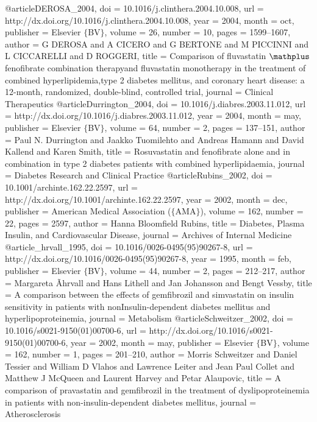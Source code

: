 @article{DEROSA_2004,
	doi = {10.1016/j.clinthera.2004.10.008},
	url = {http://dx.doi.org/10.1016/j.clinthera.2004.10.008},
	year = 2004,
	month = {oct},
	publisher = {Elsevier $\lbrace$BV$\rbrace$},
	volume = {26},
	number = {10},
	pages = {1599--1607},
	author = {G DEROSA and A CICERO and G BERTONE and M PICCINNI and L CICCARELLI and D ROGGERI},
	title = {Comparison of fluvastatin $\mathplus$ fenofibrate combination therapyand fluvastatin monotherapy in the treatment of combined hyperlipidemia,type 2 diabetes mellitus, and coronary heart disease: a 12-month, randomized, double-blind, controlled trial},
	journal = {Clinical Therapeutics}
}
@article{Durrington_2004,
	doi = {10.1016/j.diabres.2003.11.012},
	url = {http://dx.doi.org/10.1016/j.diabres.2003.11.012},
	year = 2004,
	month = {may},
	publisher = {Elsevier $\lbrace$BV$\rbrace$},
	volume = {64},
	number = {2},
	pages = {137--151},
	author = {Paul N. Durrington and Jaakko Tuomilehto and Andreas Hamann and David Kallend and Karen Smith},
	title = {Rosuvastatin and fenofibrate alone and in combination in type 2 diabetes patients with combined hyperlipidaemia},
	journal = {Diabetes Research and Clinical Practice}
}
@article{Rubins_2002,
	doi = {10.1001/archinte.162.22.2597},
	url = {http://dx.doi.org/10.1001/archinte.162.22.2597},
	year = 2002,
	month = {dec},
	publisher = {American Medical Association ($\lbrace$AMA$\rbrace$)},
	volume = {162},
	number = {22},
	pages = {2597},
	author = {Hanna Bloomfield Rubins},
	title = {Diabetes, Plasma Insulin, and Cardiovascular Disease},
	journal = {Archives of Internal Medicine}
}
@article{_hrvall_1995,
	doi = {10.1016/0026-0495(95)90267-8},
	url = {http://dx.doi.org/10.1016/0026-0495(95)90267-8},
	year = 1995,
	month = {feb},
	publisher = {Elsevier $\lbrace$BV$\rbrace$},
	volume = {44},
	number = {2},
	pages = {212--217},
	author = {Margareta Ãhrvall and Hans Lithell and Jan Johansson and Bengt Vessby},
	title = {A comparison between the effects of gemfibrozil and simvastatin on insulin sensitivity in patients with non{\textemdash}Insulin-dependent diabetes mellitus and hyperlipoproteinemia},
	journal = {Metabolism}
}
@article{Schweitzer_2002,
	doi = {10.1016/s0021-9150(01)00700-6},
	url = {http://dx.doi.org/10.1016/s0021-9150(01)00700-6},
	year = 2002,
	month = {may},
	publisher = {Elsevier $\lbrace$BV$\rbrace$},
	volume = {162},
	number = {1},
	pages = {201--210},
	author = {Morris Schweitzer and Daniel Tessier and William D Vlahos and Lawrence Leiter and Jean Paul Collet and Matthew J McQueen and Laurent Harvey and Petar Alaupovic},
	title = {A comparison of pravastatin and gemfibrozil in the treatment of dyslipoproteinemia in patients with non-insulin-dependent diabetes mellitus},
	journal = {Atherosclerosis}
}
